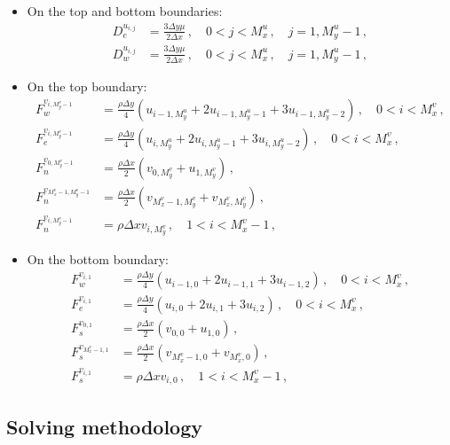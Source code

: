 \documentclass{article}
\begin{document}
\begin{itemize}
	\item On the top and bottom boundaries:
	\begin{align}
		D_e^{u_{i,j}} & = \frac{3 \Delta y \mu}{2 \Delta x}\,, \quad 0 < j < M_x^u\,, \quad j = 1, M_y^u - 1\,, \\
		D_w^{u_{i,j}} & = \frac{3 \Delta y \mu}{2 \Delta x}\,, \quad 0 < j < M_x^u\,, \quad j = 1, M_y^u - 1\,,
	\end{align}
	\item On the top boundary:
	\begin{align}
		F_w^{v_{i, M_y^v - 1}} & = \frac{\rho \Delta y}{4} \left( u_{i - 1, M_y^u} + 2 u_{i - 1, M_y^u - 1} + 3 u_{i - 1, M_y^u - 2} \right)\,, \quad 0 < i < M_x^v\,, \\
		F_e^{v_{i, M_y^v - 1}} & = \frac{\rho \Delta y}{4} \left( u_{i, M_y^u} + 2 u_{i, M_y^u - 1} + 3 u_{i, M_y^u - 2} \right)\,, \quad 0 < i < M_x^v\,, \\
		F_n^{v_{0, M_y^v - 1}} & = \frac{\rho \Delta x}{2} \left( v_{0, M_y^v} + u_{1, M_y^v} \right) \,, \\
		F_n^{v_{M_x^v - 1, M_y^v - 1}} & = \frac{\rho \Delta x}{2} \left( v_{M_x^v - 1, M_y^v} + v_{M_x^v, M_y^v} \right) \,, \\
		F_n^{v_{i, M_y^v - 1}} & = \rho \Delta x v_{i, M_y^v}\,, \quad 1 < i < M_x^v - 1 \,, 
	\end{align}
	\item On the bottom boundary:
	\begin{align}
		F_w^{v_{i, 1}} & = \frac{\rho \Delta y}{4} \left( u_{i - 1, 0} + 2 u_{i - 1, 1} + 3 u_{i - 1, 2} \right)\,, \quad 0 < i < M_x^v\,, \\
		F_e^{v_{i, 1}} & = \frac{\rho \Delta y}{4} \left( u_{i, 0} + 2 u_{i, 1} + 3 u_{i, 2} \right)\,, \quad 0 < i < M_x^v\,, \\
		F_s^{v_{0, 1}} & = \frac{\rho \Delta x}{2} \left( v_{0, 0} + u_{1, 0} \right) \,, \\
		F_s^{v_{M_x^v - 1, 1}} & = \frac{\rho \Delta x}{2} \left( v_{M_x^v - 1, 0} + v_{M_x^v, 0} \right) \,, \\
		F_s^{v_{i, 1}} & = \rho \Delta x v_{i, 0}\,, \quad 1 < i < M_x^v - 1 \,, 
	\end{align}
\end{itemize}
\subsection*{Solving methodology}
\end{document}

